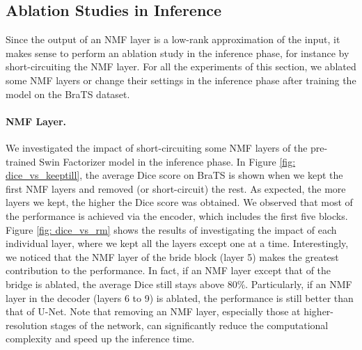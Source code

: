 \documentclass[a4,12pt]{article}
\begin{document}
	
	\subsection{Ablation Studies in Inference}  \label{sec: inference ablation studies}
	Since the output of an NMF layer is a low-rank approximation of the input, it makes sense to perform an ablation study in the inference phase, for instance by short-circuiting the NMF layer. For all the experiments of this section, we ablated some NMF layers or change their settings in the inference phase after training the model on the BraTS dataset. 
	
	
	\paragraph{NMF Layer.} 
	We investigated the impact of short-circuiting some NMF layers of the pre-trained Swin Factorizer model in the inference phase. In Figure \ref{fig: dice_vs_keeptill}, the average Dice score on BraTS is shown when we kept the first NMF layers and removed (or short-circuit) the rest. As expected, the more layers we kept, the higher the Dice score was obtained. We observed that most of the performance is achieved via the encoder, which includes the first five blocks. Figure \ref{fig: dice_vs_rm} shows the results of investigating the impact of each individual layer, where we kept all the layers except one at a time. Interestingly, we noticed that the NMF layer of the bride block (layer 5) makes the greatest contribution to the performance. In fact, if an NMF layer except that of the bridge is ablated, the average Dice still stays above 80\%. Particularly, if an NMF layer in the decoder (layers 6 to 9) is ablated, the performance is still better than that of U-Net. Note that removing an NMF layer, especially those at higher-resolution stages of the network, can significantly reduce the computational complexity and speed up the inference time.   
	
\end{document}
